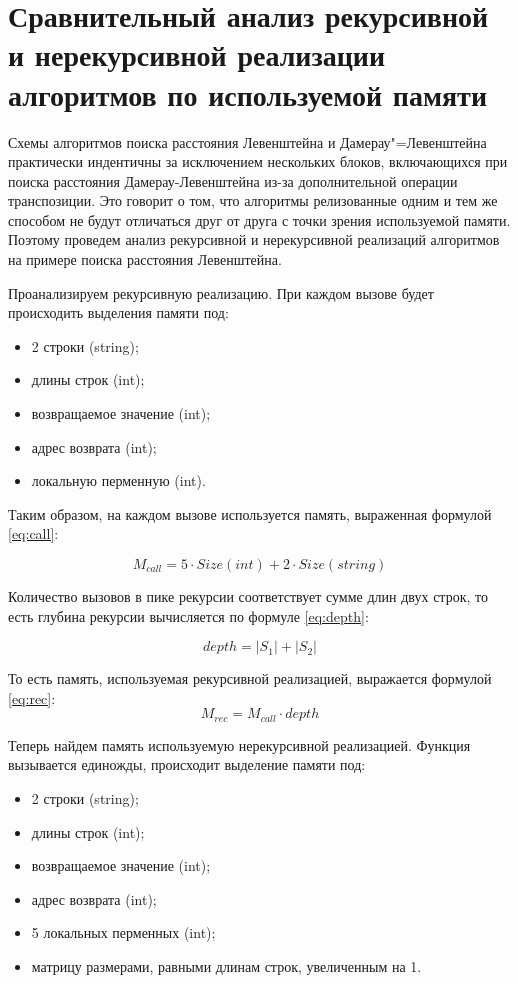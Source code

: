 \clearpage

\section{Сравнительный анализ рекурсивной и нерекурсивной реализации
         алгоритмов по используемой памяти}

Схемы алгоритмов поиска расстояния Левенштейна и Дамерау"=Левенштейна
практически индентичны за исключением нескольких блоков, включающихся при
поиска расстояния Дамерау-Левенштейна из-за дополнительной операции
транспозиции. Это говорит о том, что алгоритмы релизованные одним и тем же
способом не будут отличаться друг от друга с точки зрения используемой памяти.
Поэтому проведем анализ рекурсивной и нерекурсивной реализаций алгоритмов на
примере поиска расстояния Левенштейна.

Проанализируем рекурсивную реализацию. При каждом вызове будет происходить
выделения памяти под:
\begin{itemize}
    \item 2 строки (string);
    \item длины строк (int);
    \item возвращаемое значение (int);
    \item адрес возврата (int);
    \item локальную перменную (int).
\end{itemize}

Таким образом, на каждом вызове используется память, выраженная формулой
\ref{eq:call}:

\begin{equation}\label{eq:call}
    M_{call} = 5 \cdot Size(int) + 2 \cdot Size(string)
\end{equation}

Количество вызовов в пике рекурсии соответствует сумме длин двух строк, то есть
глубина рекурсии вычисляется по формуле \ref{eq:depth}:

\begin{equation}\label{eq:depth}
    depth = |S_1| + |S_2|
\end{equation}

То есть память, используемая рекурсивной реализацией, выражается формулой
\ref{eq:rec}:
\begin{equation}\label{eq:rec}
    M_{rec} = M_{call} \cdot depth
\end{equation}

Теперь найдем память используемую нерекурсивной реализацией. Функция вызывается
единожды, происходит выделение памяти под:
\begin{itemize}
    \item 2 строки (string);
    \item длины строк (int);
    \item возвращаемое значение (int);
    \item адрес возврата (int);
    \item 5 локальных перменных (int);
    \item матрицу размерами, равными длинам строк, увеличенным на 1.
\end{itemize}

